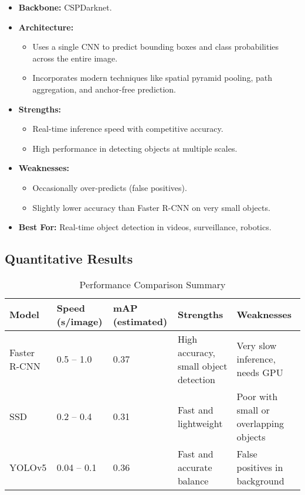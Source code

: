 \documentclass[12pt]{article}
\begin{document}
\begin{itemize}
    \item \textbf{Backbone:} CSPDarknet.
    \item \textbf{Architecture:}
    \begin{itemize}
        \item Uses a single CNN to predict bounding boxes and class probabilities across the entire image.
        \item Incorporates modern techniques like spatial pyramid pooling, path aggregation, and anchor-free prediction.
    \end{itemize}
    \item \textbf{Strengths:}
    \begin{itemize}
        \item Real-time inference speed with competitive accuracy.
        \item High performance in detecting objects at multiple scales.
    \end{itemize}
    \item \textbf{Weaknesses:}
    \begin{itemize}
        \item Occasionally over-predicts (false positives).
        \item Slightly lower accuracy than Faster R-CNN on very small objects.
    \end{itemize}
    \item \textbf{Best For:} Real-time object detection in videos, surveillance, robotics.
\end{itemize}

\subsection*{Quantitative Results}

\begin{table}[H]
\centering
\caption{Performance Comparison Summary}
\begin{tabular}{@{}l p{3cm} p{2.5cm} p{4cm} p{4cm}@{}}
\toprule
\textbf{Model} & \textbf{Speed (s/image)} & \textbf{mAP (estimated)} & \textbf{Strengths} & \textbf{Weaknesses} \\
\midrule
Faster R-CNN & 0.5 -- 1.0 & 0.37 & High accuracy, small object detection & Very slow inference, needs GPU \\
SSD & 0.2 -- 0.4 & 0.31 & Fast and lightweight & Poor with small or overlapping objects \\
YOLOv5 & 0.04 -- 0.1 & 0.36 & Fast and accurate balance & False positives in background \\
\bottomrule
\end{tabular}
\end{table}
\end{document}
